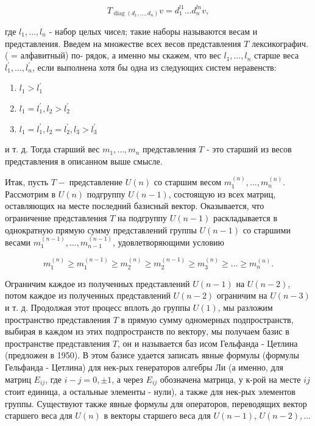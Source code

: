 \documentclass[10pt]{article}
\begin{document}
\[

T_{\operatorname{diag}\left(d_{1}, \ldots, d_{n}\right)} v=d_{1}^{l 1} \ldots d_{n}^{l n} v,

\]



где $l_{1}, \ldots, l_{n}$ - набор целых чисел; такие наборы называются весам и представления. Введем на множестве всех весов представления $T$ лексикографич. ( = алфавитный) по- рядок, а именно мы скажем, что вес $l_{1}, \ldots, l_{n}$ старше веса $l_{1}^{\prime}, \ldots, l_{n}^{\prime}$, если выполнена хотя бы одна из следующих систем неравенств:



\begin{enumerate}

  \item $l_{1}>l_{1}^{\prime}$

  \item $l_{1}=l_{1}^{\prime}, l_{2}>l_{2}^{\prime}$

  \item $l_{1}=l_{1}^{\prime}, l_{2}=l_{2}^{\prime}, l_{3}>l_{3}^{\prime}$

\end{enumerate}



и т. д. Тогда старший вес $m_{1}, \ldots, m_{n}$ представления $T$ - это старший из весов представления в описанном выше смысле.



Итак, пусть $T-$ представление $U(n)$ со старшим весом $m_{1}^{(n)}, \ldots, m_{n}^{(n)}$. Рассмотрим в $U(n)$ подгруппу $U(n-1)$, состоящую из всех матриц, оставляющих на месте последний базисный вектор. Оказывается, что ограничение представления $T$ на подгруппу $U(n-1)$ раскладывается в однократную прямую сумму представлений группы $U(n-1)$ со старшими весами $m_{1}^{(n-1)}, \ldots, m_{n-1}^{(n-1)}$, удовлетворяющими условию



\[

m_{1}^{(n)} \geqslant m_{1}^{(n-1)} \geqslant m_{2}^{(n)} \geqslant m_{2}^{(n-1)} \geqslant m_{3}^{(n)} \geqslant \ldots \geqslant m_{n}^{(n)} .

\]



Ограничим каждое из полученных представлений $U(n-1)$ на $U(n-2)$, потом каждое из полученных представлений $U(n-2)$ ограничим на $U(n-3)$ и т. д. Продолжая этот процесс вплоть до группы $U(1)$, мы разложим пространство представления $T$ в прямую сумму одномерных подпространств, выбирая в каждом из этих подпространств по вектору, мы получаем базис в пространстве представления $T$, он и называется баз исом Гельфанда - Цетлина (предложен в 1950). В этом базисе удается записать явные формулы (формулы Гельфанда - Цетлина) для нек-рых генераторов алгебры Ли (а именно, для матриц $E_{i j}$, где $i-j=0, \pm 1$, а через $E_{i j}$ обозначена матрица, у к-рой на месте $i j$ стоит единица, а остальные элементы - нули), а также для нек-рых элементов группы. Существуют также явные формулы для операторов, переводящих вектор старшего веса для $U(n)$ в векторы старшего веса для $U(n-1)$, $U(n-2), \ldots$
\end{document}
